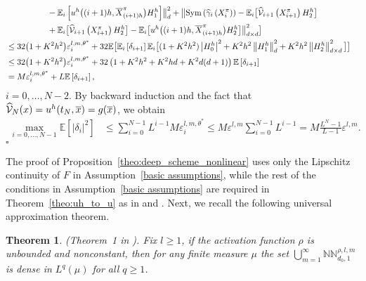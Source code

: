 \documentclass[12pt]{article}
\newtheorem{theorem}[prop]{Theorem}
\numberwithin{equation}{section}
\newenvironment{Proof}{\removelastskip\par\medskip \noindent{\em Proof.} \rm}{\penalty-20\null\hfill$\square$\par\medbreak}
\newcommand{\E}{\mathbb{E}}
\let\oldcitet=\citet
\renewcommand{\cite}[1]{\textcolor[rgb]{0,0,1}{\oldcitet{#1}}}
\renewcommand{\citet}[1]{\textcolor[rgb]{0,0,1}{\oldcitet{#1}}}
\begin{document}
\begin{Proof}
\begin{align*}
                          \\
                          & \quad\qquad\qquad
                          -  \E_i\left[ u^h\big((i+1)h, \overline{X}^\pi_{(i+1)h}\big)H_1^h\right]\bigr\rVert_d^2  + \bigl\lVert {\rm Sym} \left( \widehat{\cal \gamma}_i\left(X^\pi_i\right) \right) - \E_i\big[ \widehat{\cal V}_{i+1}\left(X^\pi_{i+1}\right)H_2^h\big] \\
            & \quad\qquad\qquad + \E_i\big[ \widehat{\cal V}_{i+1}\left(X^\pi_{i+1}\right)H_2^h\big] -  \E_i\big[ u^h\big((i+1)h, \overline{X}^\pi_{(i+1)h}\big)H_2^h\big]\bigr\rVert_{d\times d}^2 \big] \\
          & \leq 32\big(1 + K^2h^2\big) \varepsilon_i^{{l ,m}, \theta^*}
	  + 32\E \big[ \E_i\left[\delta_{i+1}\right]\E_i\big[(1+K^2h^2)\left\lvert H_0^h \right\rvert^2
		  + K^2h^2\left\lVert H_1^h \right\rVert_d^2 + K^2h^2\left\lVert H_2^h \right\rVert_{d\times d}^2\big] \big] \\
          & \leq 32\big(1 + K^2h^2\big) \varepsilon_i^{{l ,m}, \theta^*}
          + 32\left(1+K^2h^2 + K^2hd + K^2 d(d+1) \right) \E\left[ \delta_{i+1} \right]
	  \\
           & = M\varepsilon_i^{{l ,m}, \theta^*} + L \E\left[ \delta_{i+1} \right],
\end{align*}
$i=0,\ldots , N-2$.
By backward induction and
the fact that $\widehat{\cal V}_{N}(x) = u^h(t_N, \overline{x}) = g(\overline{x})$,
we obtain
\begin{align*}
\max_{i=0,\ldots,N-1} \E [ |\delta_i|^2 ] &\leq \sum\limits_{i = 0}^{N-1} L^{i-1}M \varepsilon_i^{{l ,m}, \theta^*} \leq M \varepsilon^{l ,m} \sum\limits_{i = 0}^{N-1} L^{i-1} = M \frac{L^N - 1}{L-1}\varepsilon^{l ,m}.
\end{align*}
\end{Proof}
The proof of Proposition~\ref{theo:deep_scheme_nonlinear}
uses only the Lipschitz continuity of $F$ in Assumption~\ref{basic assumptions},
while the rest of the conditions in Assumption~\ref{basic assumptions}
are required in Theorem~\ref{theo:uh_to_u}
as in \cite{fahim} and \cite{ren2017convergence}.
 Next, we recall the following universal approximation theorem.
\begin{theorem}
  \label{t1}
  (Theorem~1 in \cite{hornik1991approximation}).
    Fix $l  \ge 1$,
    if the activation function $\rho$ is unbounded and nonconstant, then
    for any finite measure $\mu$ the set
    $\bigcup\limits_{m = 1}^{\infty} \mathbb{NN}^{\rho,l ,m}_{d_0, 1}$
    is dense in $L^q(\mu)$ for all $q \ge 1$.
\end{theorem}
\end{document}
